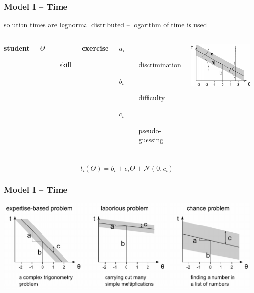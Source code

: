 \documentclass[xcolor=svgnames]{beamer}
\begin{document}
\begin{frame}
	\frametitle{Model I -- Time}

	\bigskip
	solution times are lognormal distributed -- logarithm of time is used

	\bigskip
	\begin{columns}
		\textbf{student}
		\begin{description}
			\item[$\Theta$]	skill
		\end{description}
		\textbf{exercise}
		\begin{description}
			\item[$a_i$] discrimination
			\item[$b_i$] difficulty
			\item[$c_i$] pseudo-guessing
		\end{description}
		\includegraphics[width=\textwidth]{imgs/time-model.png}
	\end{columns}
	\begin{center}
		$$
		t_i(\Theta) = b_i + a_i\Theta + \mathcal{N}(0, c_i)
		$$
	\end{center}
\end{frame}
\begin{frame}
	\frametitle{Model I -- Time}

	\begin{center}
		\includegraphics[width=.95\textwidth]{imgs/time-model-types.png}
	\end{center}
\end{frame}
\end{document}
